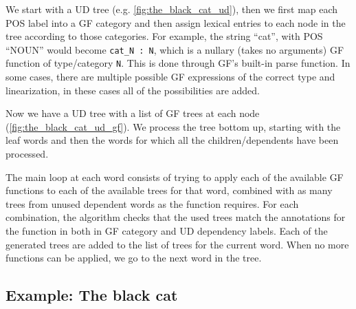 




We start with a \ac{UD} tree (e.g. \autoref{fig:the_black_cat_ud}), then we first map each \ac{POS} label into a \ac{GF} category and then assign lexical entries to each node in the tree according to those categories. For example, the string ``cat'', with \ac{POS} ``NOUN'' would become \lstinline|cat_N : N|, which is a nullary (takes no arguments) \ac{GF} function of type/category \lstinline|N|. This is done through \ac{GF}'s built-in parse function. In some cases, there are multiple possible \ac{GF} expressions of the correct type and linearization, in these cases all of the possibilities are added.

Now we have a \ac{UD} tree with a list of \ac{GF} trees at each node (\autoref{fig:the_black_cat_ud_gf}). We process the tree bottom up, starting with the leaf words and then the words for which all the children/dependents have been processed.

The main loop at each word consists of trying to apply each of the available \ac{GF} functions to each of the available trees for that word, combined with as many trees from unused dependent words as the function requires. For each combination, the algorithm checks that the used trees match the annotations for the function in both in \ac{GF} category and \ac{UD} dependency labels. Each of the generated trees are added to the list of trees for the current word.
When no more functions can be applied, we go to the next word in the tree.

\subsection{Example: The black cat}

